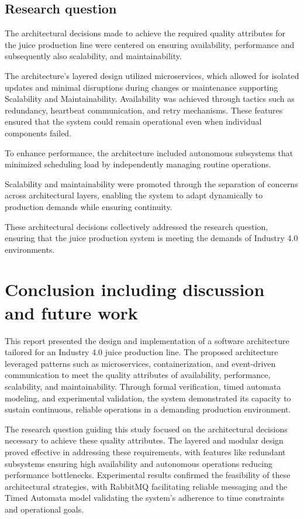 \documentclass[conference]{IEEEtran}
\begin{document}
\subsection{Research question}
The architectural decisions made to achieve the required quality attributes for the juice production line were centered on ensuring availability, performance and subsequently also scalability, and maintainability.

The architecture's layered design utilized microservices, which allowed for isolated updates and minimal disruptions during changes or maintenance supporting Scalability and Maintainability. Availability was achieved through tactics such as redundancy, heartbeat communication, and retry mechanisms. These features ensured that the system could remain operational even when individual components failed.

To enhance performance, the architecture included autonomous subsystems that minimized scheduling load by independently managing routine operations.

 Scalability and maintainability were promoted through the separation of concerns across architectural layers, enabling the system to adapt dynamically to production demands while ensuring continuity.

 These architectural decisions collectively addressed the research question, ensuring that the juice production system is meeting the demands of Industry 4.0 environments.

\section{Conclusion including discussion and future work}
This report presented the design and implementation of a software architecture tailored for an Industry 4.0 juice production line. The proposed architecture leveraged patterns such as microservices, containerization, and event-driven communication to meet the quality attributes of availability, performance, scalability, and maintainability. Through formal verification, timed automata modeling, and experimental validation, the system demonstrated its capacity to sustain continuous, reliable operations in a demanding production environment.

The research question guiding this study focused on the architectural decisions necessary to achieve these quality attributes. The layered and modular design proved effective in addressing these requirements, with features like redundant subsystems ensuring high availability and autonomous operations reducing performance bottlenecks. Experimental results confirmed the feasibility of these architectural strategies, with RabbitMQ facilitating reliable messaging and the Timed Automata model validating the system's adherence to time constraints and operational goals.
\end{document}
